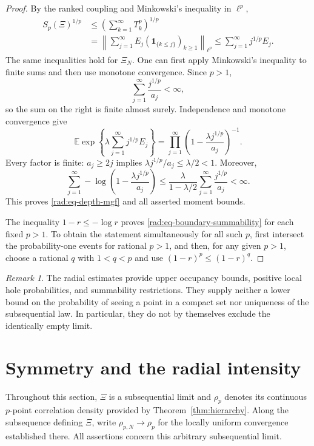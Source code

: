 \documentclass[11pt,a4paper]{article}
\numberwithin{equation}{section}
\theoremstyle{definition}
\theoremstyle{remark}
\newtheorem{remark}[theorem]{Remark}
\newcommand{\E}{\mathbb E}
\newcommand{\ind}{\mathbf 1}
\begin{document}
\begin{proof}
By the ranked coupling and Minkowski's inequality in $\ell^p$,
\begin{align*}
 S_p(\Xi)^{1/p}
 &\leq\left(\sum_{k=1}^{\infty}T_k^p\right)^{1/p}\\
 &=\left\|\sum_{j=1}^{\infty}
           E_j(\ind_{\{k\leq j\}})_{k\geq1}\right\|_{\ell^p}
 \leq\sum_{j=1}^{\infty}j^{1/p}E_j.
\end{align*}
The same inequalities hold for $\Xi_N$.  One can first apply
Minkowski's inequality to finite sums and then use monotone convergence.
Since $p>1$,
\[
 \sum_{j=1}^{\infty}\frac{j^{1/p}}{a_j}<\infty,
\]
so the sum on the right is finite almost surely.  Independence and
monotone convergence give
\[
 \E\exp\left\{\lambda\sum_{j=1}^{\infty}j^{1/p}E_j\right\}
 =\prod_{j=1}^{\infty}
 \left(1-\frac{\lambda j^{1/p}}{a_j}\right)^{-1}.
\]
Every factor is finite: $a_j\geq2j$ implies
$\lambda j^{1/p}/a_j\leq\lambda/2<1$.  Moreover,
\[
 \sum_{j=1}^{\infty}
 -\log\left(1-\frac{\lambda j^{1/p}}{a_j}\right)
 \leq\frac{\lambda}{1-\lambda/2}
       \sum_{j=1}^{\infty}\frac{j^{1/p}}{a_j}<\infty.
\]
This proves \eqref{rad:eq-depth-mgf} and all asserted moment bounds.

The inequality $1-r\leq-\log r$ proves
\eqref{rad:eq-boundary-summability} for each fixed $p>1$.  To obtain the
statement simultaneously for all such $p$, first intersect the
probability-one events for rational $p>1$, and then, for any given
$p>1$, choose a rational $q$ with $1<q<p$ and use
$(1-r)^p\leq(1-r)^q$.
\end{proof}

\begin{remark}
\label{rad:rem-scope}
The radial estimates provide upper occupancy bounds, positive local
hole probabilities, and summability restrictions.  They supply neither
a lower bound on the probability of seeing a point in a compact set
nor uniqueness of the subsequential law.  In particular, they do not by
themselves exclude the identically empty limit.
\end{remark}

\section{Symmetry and the radial intensity}
\label{sec:intensity-extensions}

Throughout this section, $\Xi$ is a subsequential limit and
$\rho_p$ denotes its continuous $p$-point correlation density provided by
Theorem~\ref{thm:hierarchy}. Along the subsequence defining $\Xi$, write
$\rho_{p,N}\to\rho_p$ for the locally uniform convergence established
there. All assertions concern this arbitrary subsequential limit.
\end{document}
